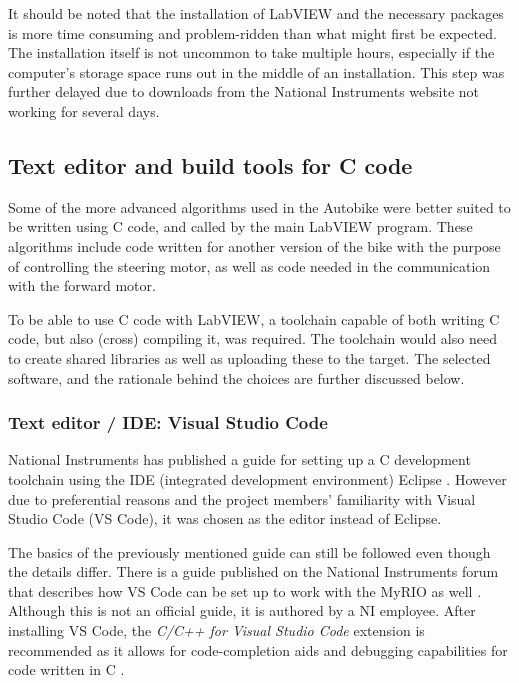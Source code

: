 It should be noted that the installation of LabVIEW and the necessary packages is more time consuming and problem-ridden than what might first be expected. The installation itself is not uncommon to take multiple hours, especially if the computer's storage space runs out in the middle of an installation. This step was further delayed due to downloads from the National Instruments website not working for several days.

\subsection{Text editor and build tools for C code}

Some of the more advanced algorithms used in the Autobike were better suited to be written using C code, and called by the main LabVIEW program. These algorithms include code written for another version of the bike with the purpose of controlling the steering motor, as well as code needed in the communication with the forward motor.

To be able to use C code with LabVIEW, a toolchain capable of both writing C code, but also (cross) compiling it, was required. The toolchain would also need to create shared libraries as well as uploading these to the target. The selected software, and the rationale behind the choices are further discussed below.

\subsubsection{Text editor / IDE: Visual Studio Code}

National Instruments has published a guide for setting up a C development toolchain using the IDE (integrated development environment) Eclipse \cite{NationalInstruments2021GettingEdition}. However due to preferential reasons and the project members' familiarity with Visual Studio Code (VS Code), it was chosen as the editor instead of Eclipse. 

The basics of the previously mentioned guide can still be followed even though the details differ. There is a guide published on the National Instruments forum that describes how VS Code can be set up to work with the MyRIO as well \cite{J2020NICode}. Although this is not an official guide, it is authored by a NI employee. After installing VS Code, the \textit{C/C++ for Visual Studio Code} extension is recommended as it allows for code-completion aids and debugging capabilities for code written in C \cite{VanLiew2022C++Code}. 

